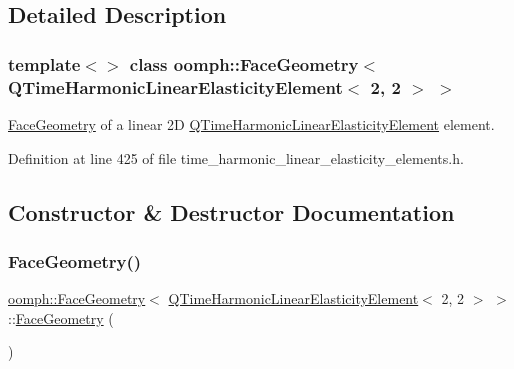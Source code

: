 \subsection{Detailed Description}
\subsubsection*{template$<$$>$\newline
class oomph\+::\+Face\+Geometry$<$ Q\+Time\+Harmonic\+Linear\+Elasticity\+Element$<$ 2, 2 $>$ $>$}

\hyperlink{classoomph_1_1FaceGeometry}{Face\+Geometry} of a linear 2D \hyperlink{classoomph_1_1QTimeHarmonicLinearElasticityElement}{Q\+Time\+Harmonic\+Linear\+Elasticity\+Element} element. 

Definition at line 425 of file time\+\_\+harmonic\+\_\+linear\+\_\+elasticity\+\_\+elements.\+h.



\subsection{Constructor \& Destructor Documentation}
\mbox{\label{classoomph_1_1FaceGeometry_3_01QTimeHarmonicLinearElasticityElement_3_012_00_012_01_4_01_4_a0ac41447cb823d082a7e0132bf95bc36}} 
\subsubsection{\texorpdfstring{Face\+Geometry()}{FaceGeometry()}}
{\footnotesize\ttfamily \hyperlink{classoomph_1_1FaceGeometry}{oomph\+::\+Face\+Geometry}$<$ \hyperlink{classoomph_1_1QTimeHarmonicLinearElasticityElement}{Q\+Time\+Harmonic\+Linear\+Elasticity\+Element}$<$ 2, 2 $>$ $>$\+::\hyperlink{classoomph_1_1FaceGeometry}{Face\+Geometry} (\begin{DoxyParamCaption}{ }\end{DoxyParamCaption})\hspace{0.3cm}{\ttfamily [inline]}}



